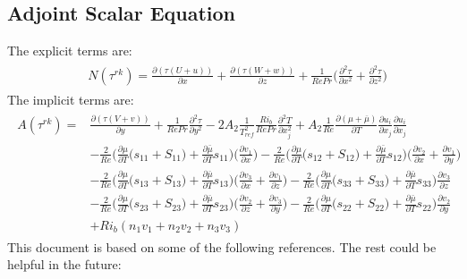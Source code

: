 \documentclass[preprint,12pt]{article}
\begin{document}
\subsection{Adjoint Scalar Equation}
The explicit terms are:
\begin{align}\begin{split}
&N(\tau^{rk})=\frac{\partial(\tau(U+u))}{\partial x}+\frac{\partial(\tau(W+w))}{\partial z}+\frac{1}{RePr}\Bigg(\frac{\partial^2\tau}{\partial x^2}+\frac{\partial^2\tau}{\partial z^2}\Bigg)
\end{split} \end{align}
The implicit terms are:
\begin{align}\begin{split}
A(\tau^{rk})=&\frac{\partial(\tau(V+v))}{\partial y}+\frac{1}{RePr}\frac{\partial^2\tau}{\partial y^2}-2A_2\frac{1}{T_{ref}^2}\frac{Ri_b}{Re Pr}\frac{\partial^2 T}{\partial x_j^2}+A_2\frac{1}{Re}\frac{\partial (\mu+\overline{\mu})}{\partial T}\frac{\partial u_{i}}{\partial x_j}\frac{\partial u_{i}}{\partial x_j}\\&-\frac{2}{Re}\Big(\frac{\partial\mu}{\partial T}\big(s_{11}+S_{11}\big)+\frac{\partial\bar{\mu}}{\partial T}s_{11}\Big)\Bigg(\frac{\partial v_1}{\partial x}\Bigg)-\frac{2}{Re}\Big(\frac{\partial\mu}{\partial T}\big(s_{12}+S_{12}\big)+\frac{\partial\bar{\mu}}{\partial T}s_{12}\Big)\Bigg(\frac{\partial v_2}{\partial x}+\frac{\partial v_1}{\partial y}\Bigg)\\&-\frac{2}{Re}\Big(\frac{\partial\mu}{\partial T}\big(s_{13}+S_{13}\big)+\frac{\partial\bar{\mu}}{\partial T}s_{13}\Big)\Bigg(\frac{\partial v_3}{\partial x}+\frac{\partial v_1}{\partial z}\Bigg)-\frac{2}{Re}\Big(\frac{\partial\mu}{\partial T}\big(s_{33}+S_{33}\big)+\frac{\partial\bar{\mu}}{\partial T}s_{33}\Big)\frac{\partial v_3}{\partial z}\\&-\frac{2}{Re}\Big(\frac{\partial\mu}{\partial T}\big(s_{23}+S_{23}\big)+\frac{\partial\bar{\mu}}{\partial T}s_{23}\Big)\Bigg(\frac{\partial v_2}{\partial z}+\frac{\partial v_3}{\partial y}\Bigg)-\frac{2}{Re}\Big(\frac{\partial\mu}{\partial T}\big(s_{22}+S_{22}\big)+\frac{\partial\bar{\mu}}{\partial T}s_{22}\Big)\frac{\partial v_2}{\partial y}\\&+Ri_b(n_1v_1+n_2v_2+n_3v_3)
\end{split}
\end{align}
\pagebreak
This document is based on some of the following references. The rest could be helpful in the future: \cite{kaminski2014transient,pringle2012minimal,eaves2015disruption,kaminski2017nonlinear,rabin2012triggering,winters1995available,turbulent_energy,turbulent_energy2,govindarajan2014instabilities,stratified_Instabilities,boussinesq1,marcotte2017optimal,nabi2017adjoint,notes_set,notes_set2,kundu2008fluid}


\end{document}
